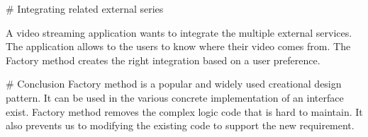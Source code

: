 # Integrating related external series

A video streaming application wants to integrate the multiple external services. The application allows to the users to know where their video comes from. The Factory method creates the right integration based on a user preference.


# Conclusion
Factory method is a popular and widely used creational design pattern. It can be used in the various concrete implementation of an interface exist. Factory method removes the complex logic code that is hard to maintain. It also prevents us to modifying the existing code to support the new requirement.

